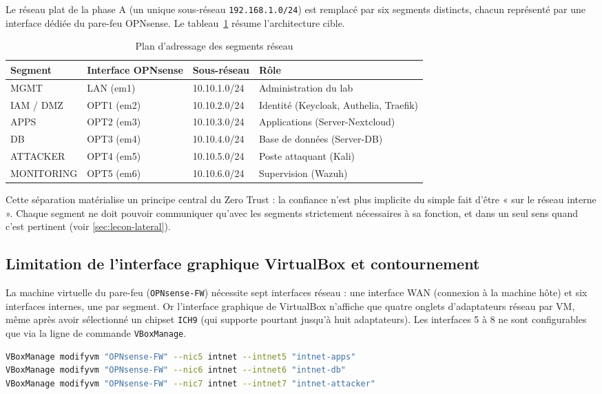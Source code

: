 Le réseau plat de la phase A (un unique sous-réseau \texttt{192.168.1.0/24})
est remplacé par six segments distincts, chacun représenté par une
interface dédiée du pare-feu OPNsense. Le tableau~\ref{tab:segments}
résume l'architecture cible.

\begin{table}[h]
\centering
\caption{Plan d'adressage des segments réseau}
\label{tab:segments}
\begin{tabular}{|l|l|l|l|}
\hline
\textbf{Segment} & \textbf{Interface OPNsense} & \textbf{Sous-réseau} & \textbf{Rôle} \\
\hline
MGMT & LAN (em1) & 10.10.1.0/24 & Administration du lab \\
IAM / DMZ & OPT1 (em2) & 10.10.2.0/24 & Identité (Keycloak, Authelia, Traefik) \\
APPS & OPT2 (em3) & 10.10.3.0/24 & Applications (Server-Nextcloud) \\
DB & OPT3 (em4) & 10.10.4.0/24 & Base de données (Server-DB) \\
ATTACKER & OPT4 (em5) & 10.10.5.0/24 & Poste attaquant (Kali) \\
MONITORING & OPT5 (em6) & 10.10.6.0/24 & Supervision (Wazuh) \\
\hline
\end{tabular}
\end{table}

Cette séparation matérialise un principe central du Zero Trust : la
confiance n'est plus implicite du simple fait d'être « sur le réseau
interne ». Chaque segment ne doit pouvoir communiquer qu'avec les segments
strictement nécessaires à sa fonction, et dans un seul sens quand c'est
pertinent (voir \ref{sec:lecon-lateral}).

\subsection{Limitation de l'interface graphique VirtualBox et contournement}

La machine virtuelle du pare-feu (\texttt{OPNsense-FW}) nécessite sept
interfaces réseau : une interface WAN (connexion à la machine hôte) et six
interfaces internes, une par segment. Or l'interface graphique de
VirtualBox n'affiche que quatre onglets d'adaptateurs réseau par VM, même
après avoir sélectionné un chipset \texttt{ICH9} (qui supporte pourtant
jusqu'à huit adaptateurs). Les interfaces 5 à 8 ne sont configurables que
via la ligne de commande \texttt{VBoxManage}.

\begin{lstlisting}[language=bash, caption={Ajout des adaptateurs réseau 5 à 7 via VBoxManage}]
VBoxManage modifyvm "OPNsense-FW" --nic5 intnet --intnet5 "intnet-apps"
VBoxManage modifyvm "OPNsense-FW" --nic6 intnet --intnet6 "intnet-db"
VBoxManage modifyvm "OPNsense-FW" --nic7 intnet --intnet7 "intnet-attacker"
\end{lstlisting}

